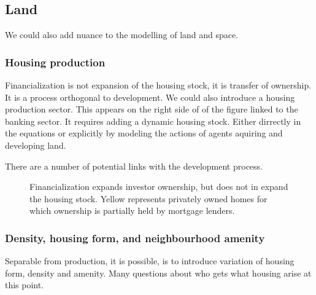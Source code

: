 \subsection{Land}

We could also add nuance to the modelling of land and space. 

\subsubsection{Housing production}

Financialization is not expansion of the housing stock, it is transfer of ownership. It is a process orthogonal to development. 
We could also introduce a housing production sector. This appears on the right side of of the figure linked to the banking sector. It requires adding a dynamic housing stock. Either dirrectly in the equations or explicitly by modeling the actions of agents aquiring and developing land. %




There are a number of potential links with the development process.

\begin{figure}
\begin{center}

\end{center}
\caption{Financialization expands investor ownership, but does not in expand the housing stock. Yellow represents privately owned homes for which ownership is partially held by mortgage lenders.}
\label{fig-financialization-expansion}
\end{figure}





\subsubsection{Density, housing form, and neighbourhood amenity}
Separable from production, it is possible, is to introduce variation of housing form,  density and amenity.  Many questions about who gets what housing arise at this point. 

